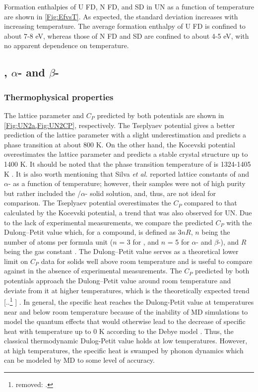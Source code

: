 \documentclass[preprint, 12pt]{elsarticle}
\providecommand{\DIFaddtex}[1]{{\protect\color{blue} \sf #1}} %
\providecommand{\DIFdeltex}[1]{{\protect\color{red} [..\footnote{removed: #1} ]}} %
\providecommand{\DIFaddbegin}{} %
\providecommand{\DIFaddend}{} %
\providecommand{\DIFdelbegin}{} %
\providecommand{\DIFdelend}{} %
\providecommand{\DIFadd}[1]{\texorpdfstring{\DIFaddtex{#1}}{#1}} %
\providecommand{\DIFdel}[1]{\texorpdfstring{\DIFdeltex{#1}}{}} %
\newcommand{\DIFscaledelfig}{0.5}
\newlength{\DIFdelgraphicswidth} %
\newlength{\DIFdelgraphicsheight} %
\newcommand{\DIFaddincludegraphics}[2][]{{\color{blue}\fbox{\DIFOincludegraphics[#1]{#2}}}} %
\newcommand{\DIFdelincludegraphics}[2][]{%
\sbox{\DIFdelgraphicsbox}{\DIFOincludegraphics[#1]{#2}}%
\settoboxwidth{\DIFdelgraphicswidth}{\DIFdelgraphicsbox} %
\settoboxtotalheight{\DIFdelgraphicsheight}{\DIFdelgraphicsbox} %
\scalebox{\DIFscaledelfig}{%
\parbox[b]{\DIFdelgraphicswidth}{\usebox{\DIFdelgraphicsbox}\\[-\baselineskip] \rule{\DIFdelgraphicswidth}{0em}}\llap{\resizebox{\DIFdelgraphicswidth}{\DIFdelgraphicsheight}{%
\setlength{\unitlength}{\DIFdelgraphicswidth}%
\begin{picture}(1,1)%
\thicklines\linethickness{2pt} %
{\color[rgb]{1,0,0}\put(0,0){\framebox(1,1){}}}%
{\color[rgb]{1,0,0}\put(0,0){\line( 1,1){1}}}%
{\color[rgb]{1,0,0}\put(0,1){\line(1,-1){1}}}%
\end{picture}%
}\hspace*{3pt}}} %
} %
\DeclareRobustCommand{\DIFaddbegin}{\DIFOaddbegin \let\includegraphics\DIFaddincludegraphics} %
\DeclareRobustCommand{\DIFaddend}{\DIFOaddend \let\includegraphics\DIFOincludegraphics} %
\DeclareRobustCommand{\DIFdelbegin}{\DIFOdelbegin \let\includegraphics\DIFdelincludegraphics} %
\DeclareRobustCommand{\DIFdelend}{\DIFOaddend \let\includegraphics\DIFOincludegraphics} %
\begin{document}
Formation enthalpies of U FD, N FD, and SD in UN as a function of temperature are shown in \cref{Fig:EfvsT}. As expected, the standard deviation increases with increasing temperature. The average formation enthalpy of U FD is confined to about 7-8 eV, whereas those of N FD and SD are confined to about 4-5 eV, with no apparent dependence on temperature.

\subsection{, $\alpha$- and $\beta$-}

\subsubsection{Thermophysical properties}

The  lattice parameter and $C_P$ predicted by both potentials are shown in \cref{Fig:UN2a,Fig:UN2CP}, respectively. The Tseplyaev potential gives a better prediction of the  lattice parameter with a slight underestimation and predicts a phase transition at about 800 K. On the other hand, the Kocevski potential overestimates the  lattice parameter and predicts a stable  \DIFaddbegin \DIFadd{crystal }\DIFaddend structure up to 1400 K. It should be noted that the phase transition temperature of  is 1324-1405 K \cite{Uno2020, Okamoto1997}. It is also worth mentioning that Silva \textit{et al.} \cite{Silva2009} reported lattice constants of  and $\alpha$- as a function of temperature; however, their samples were not of high purity but rather included the /$\alpha$- solid solution, and, thus, are not ideal for comparison. The Tseplyaev potential overestimates the  $C_P$ compared to that calculated by the Kocevski potential, a trend that was also observed for UN. Due to the lack of experimental measurements, we compare the predicted $C_P$ with the Dulong–Petit value which, for a compound, is defined as $3 n R$, $n$ being the number of atoms per formula unit ($n$ = 3 for , and $n$ = 5 for $\alpha$- and $\beta$-), and $R$ being the gas constant \cite{White2015}. The Dulong–Petit value serves as a theoretical lower limit on $C_P$ data for solids well above room temperature and is useful to compare against in the absence of experimental measurements. The  $C_P$ predicted by both potentials approach the Dulong–Petit value around room temperature and deviate from it at higher temperatures, which is the theoretically expected trend \DIFdelbegin \DIFdel{.
}\DIFdelend \DIFaddbegin \DIFadd{\cite{Ashcroft1976}. In general, the specific heat reaches the Dulong-Petit value at temperatures near and below room temperature because of the inability of MD simulations to model the quantum effects that would otherwise lead to the decrease of specific heat with temperature up to 0 K according to the Debye model \cite{Ashcroft1976}. Thus, the classical thermodynamic Dulog-Petit value holds at low temperatures. However, at high temperatures, the specific heat is swamped by phonon dynamics which can be modeled by MD to some level of accuracy.
}\DIFaddend 
\end{document}
